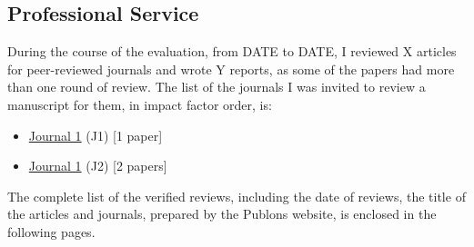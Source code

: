 \subsection{Professional Service}
\label{Professional_Service}

During the course of the evaluation, from DATE to DATE, I reviewed X articles for peer-reviewed journals and wrote Y reports, as some of the papers had more than one round of review.
%
The list of the journals I was invited to review a manuscript for them, in impact factor order, is:
\begin{itemize}
\item \href{https://journal1-address/}{Journal 1} (J1) [1 paper]
\item \href{https://journal2-address/}{Journal 1} (J2) [2 papers]
\end{itemize}
%

The complete list of the verified reviews, including the date of reviews, the title of the articles and journals, prepared by the Publons website, is enclosed in the following pages.



